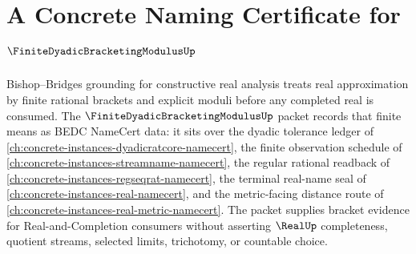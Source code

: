 \chapter{A Concrete Naming Certificate for $\FiniteDyadicBracketingModulusUp$}
\label{ch:concrete-instances-finite-dyadic-bracketing-modulus-namecert}

Bishop--Bridges grounding for constructive real analysis treats real approximation by finite rational brackets and explicit moduli before any completed real is consumed. The $\FiniteDyadicBracketingModulusUp$ packet records that finite means as BEDC NameCert data: it sits over the dyadic tolerance ledger of \autoref{ch:concrete-instances-dyadicratcore-namecert}, the finite observation schedule of \autoref{ch:concrete-instances-streamname-namecert}, the regular rational readback of \autoref{ch:concrete-instances-regseqrat-namecert}, the terminal real-name seal of \autoref{ch:concrete-instances-real-namecert}, and the metric-facing distance route of \autoref{ch:concrete-instances-real-metric-namecert}. The packet supplies bracket evidence for Real-and-Completion consumers without asserting $\RealUp$ completeness, quotient streams, selected limits, trichotomy, or countable choice.

